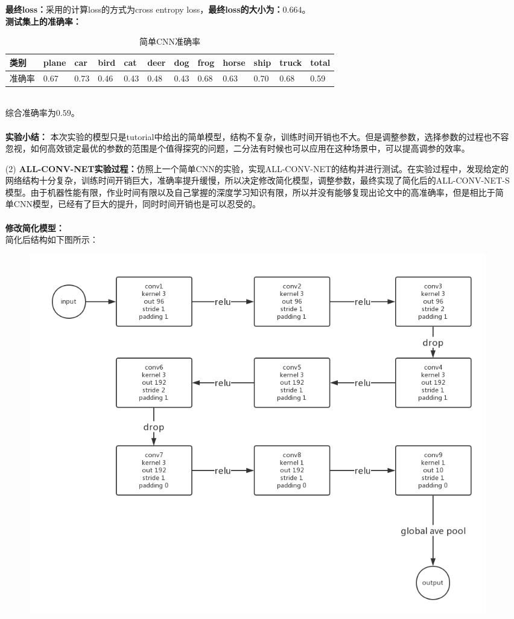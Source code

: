 \documentclass[a4paper,UTF8]{article}
\numberwithin{equation}{section}
\begin{document}
\begin{enumerate}
\textbf{最终loss：}采用的计算loss的方式为cross entropy loss，\textbf{最终loss的大小为：$0.664$}。\\
\textbf{测试集上的准确率：}
\begin{table}[h]
	\centering
	\caption{简单CNN准确率}
	\label{ac2}
	\begin{tabular}{|l|l|l|l|l|l|l|l|l|l|l|l|}
		\hline
	类别	& plane & car & bird & cat & deer & dog & frog & horse & ship & truck & total \\ \hline
	准确率	& 0.67 & 0.73 & 0.46 & 0.43 & 0.48 & 0.43 & 0.68 & 0.63 & 0.70 & 0.68 & 0.59 \\ \hline
	\end{tabular}
\end{table}\\
综合准确率为$0.59$。\\\\
\textbf{实验小结：}
本次实验的模型只是tutorial中给出的简单模型，结构不复杂，训练时间开销也不大。但是调整参数，选择参数的过程也不容忽视，如何高效锁定最优的参数的范围是个值得探究的问题，二分法有时候也可以应用在这种场景中，可以提高调参的效率。
\item [(2)]
\textbf{ALL-CONV-NET实验过程：}仿照上一个简单CNN的实验，实现ALL-CONV-NET的结构并进行测试。在实验过程中，发现给定的网络结构十分复杂，训练时间开销巨大，准确率提升缓慢，所以决定修改简化模型，调整参数，最终实现了简化后的ALL-CONV-NET-S模型。由于机器性能有限，作业时间有限以及自己掌握的深度学习知识有限，所以并没有能够复现出论文中的高准确率，但是相比于简单CNN模型，已经有了巨大的提升，同时时间开销也是可以忍受的。\\\\
\textbf{修改简化模型：}\\
简化后结构如下图所示：
\begin{figure}[!h]
	\centering   
	\includegraphics[scale=0.3]{ng2.png}  

\end{figure}
\end{enumerate}
\end{document}
